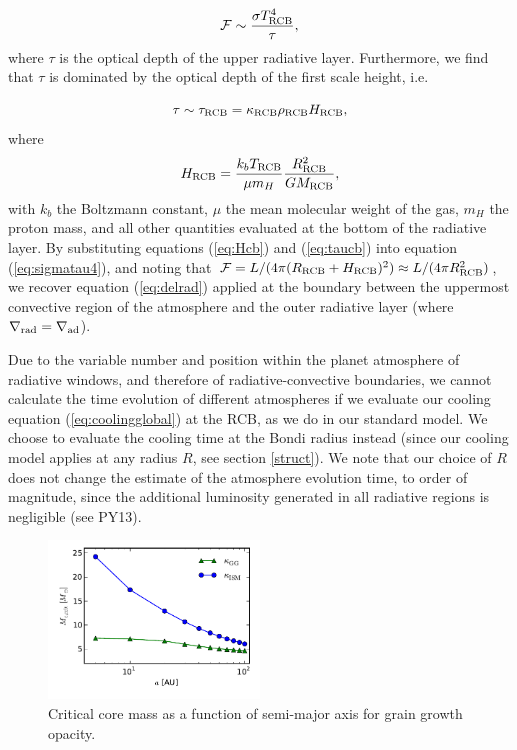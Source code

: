 \documentclass[apj]{emulateapj}
\newcommand{\delad}{\nabla_{\rm ad}}
\newcommand{\delrad}{\nabla_{\rm rad}}
\newcommand{\cb}{_{\rm RCB}}
\begin{document}
\begin{equation}
\label{eq:sigmatau4}
\mathcal{F} \sim \frac{\sigma T\cb^4}{\tau},
\end{equation}
where $\tau$ is the optical depth of the upper radiative layer. Furthermore, we find that $\tau$ is dominated by the optical depth of the first scale height, i.e. 

\begin{equation}
\label{eq:taucb}
\tau \sim \tau\cb=\kappa\cb \rho\cb H\cb,
\end{equation}
where 
\begin{equation}
\label{eq:Hcb}
H\cb=\frac{k_b T\cb}{\mu m_H} \frac{R\cb^2}{G M\cb},
\end{equation}
with $k_b$ the Boltzmann constant, $\mu$ the mean molecular weight of the gas, $m_H$ the proton mass, and all other quantities evaluated at the bottom of the radiative layer. By substituting equations (\ref{eq:Hcb}) and (\ref{eq:taucb}) into equation (\ref{eq:sigmatau4}), and noting that $\mathcal{F}=L/(4 \pi (R\cb+H\cb)^2) \approx L / (4 \pi R\cb^2)$, we recover equation (\ref{eq:delrad}) applied at the boundary between the uppermost convective region of the atmosphere and the outer radiative layer (where $\delrad=\delad$).

Due to the variable number and position within the planet atmosphere of radiative windows, and therefore of radiative-convective boundaries, we cannot calculate the time evolution of different atmospheres if we evaluate our cooling equation (\ref{eq:coolingglobal}) at the RCB, as we do in our standard model. We choose to evaluate the cooling time at the Bondi radius instead (since our cooling model applies at any radius $R$, see section \ref{struct}). We note that our choice of $R$ does not change the estimate of the atmosphere evolution time, to order of magnitude, since the additional luminosity generated in all radiative regions is negligible (see PY13). 

\begin{figure}[h!]
\centering
\includegraphics[width=0.5\textwidth]{../../figs/ModelAtmospheres/RadSelfGravRealEOS/PaperFigs/Mcrit_vs_a_gg.pdf}
\caption{Critical core mass as a function of semi-major axis for grain growth opacity.}
\label{fig:Mcritvsagg}
\end{figure}
\end{document}
